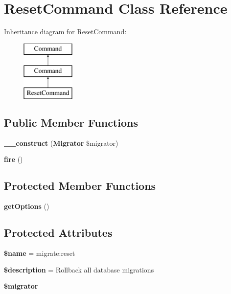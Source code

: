 \section{Reset\+Command Class Reference}
\label{class_illuminate_1_1_database_1_1_console_1_1_migrations_1_1_reset_command}
Inheritance diagram for Reset\+Command\+:\begin{figure}[H]
\begin{center}
\leavevmode
\includegraphics[height=3.000000cm]{class_illuminate_1_1_database_1_1_console_1_1_migrations_1_1_reset_command}
\end{center}
\end{figure}
\subsection*{Public Member Functions}
\begin{DoxyCompactItemize}
\item 
{\bf \+\_\+\+\_\+construct} ({\bf Migrator} \$migrator)
\item 
{\bf fire} ()
\end{DoxyCompactItemize}
\subsection*{Protected Member Functions}
\begin{DoxyCompactItemize}
\item 
{\bf get\+Options} ()
\end{DoxyCompactItemize}
\subsection*{Protected Attributes}
\begin{DoxyCompactItemize}
\item 
{\bf \$name} = \textquotesingle{}migrate\+:reset\textquotesingle{}
\item 
{\bf \$description} = \textquotesingle{}Rollback all database migrations\textquotesingle{}
\item 
{\bf \$migrator}
\end{DoxyCompactItemize}


